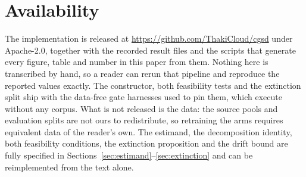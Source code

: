 \documentclass[10pt,twocolumn]{article}
\begin{document}
\section*{Availability}

The implementation is released at \url{https://github.com/ThakiCloud/cgsd} under Apache-2.0,
together with the recorded result files and the scripts that generate every figure, table and
number in this paper from them. Nothing here is transcribed by hand, so a reader can rerun that
pipeline and reproduce the reported values exactly. The constructor, both feasibility tests and
the extinction split ship with the data-free gate harnesses used to pin them, which execute
without any corpus. What is not released is the data: the source pools and evaluation splits are
not ours to redistribute, so retraining the arms requires equivalent data of the reader's own.
The estimand, the decomposition identity, both feasibility conditions, the extinction
proposition and the drift bound are fully specified in
Sections~\ref{sec:estimand}--\ref{sec:extinction} and can be reimplemented from the text alone.



\end{document}
